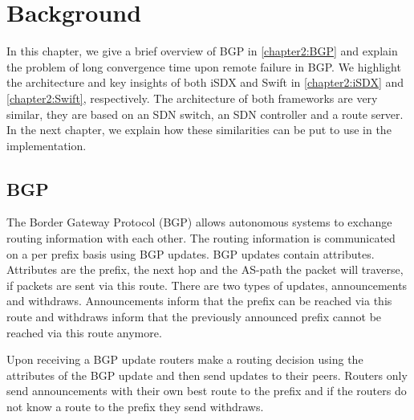 
\chapter{\label{chapter2}Background}

In this chapter, we give a brief overview of BGP in \ref{chapter2:BGP} and explain the problem of long convergence time upon remote failure in BGP. We highlight the architecture and key insights of both iSDX and Swift in \ref{chapter2:iSDX} and \ref{chapter2:Swift}, respectively. The architecture of both frameworks are very similar, they are based on an SDN switch, an SDN controller and a route server. In the next chapter, we explain how these similarities can be put to use in the implementation.

\section{\label{chapter2:BGP}BGP}

The Border Gateway Protocol (BGP) allows autonomous systems to exchange routing information with each other. The routing information is communicated on a per prefix basis using BGP updates. BGP updates contain attributes. Attributes are the prefix, the next hop and the AS-path the packet will traverse, if packets are sent via this route. There are two types of updates, announcements and withdraws. Announcements inform that the prefix can be reached via this route and withdraws inform that the previously announced prefix cannot be reached via this route anymore. 

Upon receiving a BGP update routers make a routing decision using the attributes of the BGP update and then send updates to their peers. Routers only send announcements with their own best route to the prefix and if the routers do not know a route to the prefix they send withdraws.

